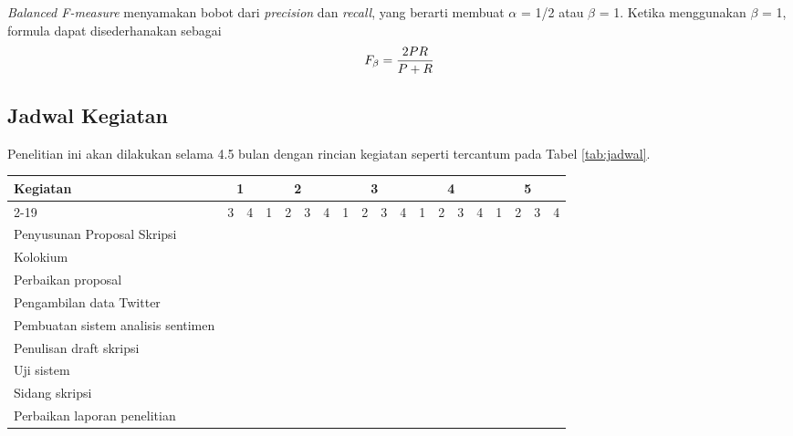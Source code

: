 \textit{Balanced F-measure} menyamakan bobot dari \textit{precision} dan \textit{recall}, yang berarti membuat $\alpha$ = 1/2 atau $\beta$ = 1. Ketika menggunakan $\beta$ = 1, formula dapat disederhanakan sebagai 
\begin{equation}
\begin{split}
\tiny
F_\beta = \frac{2PR}{P + R}
\label{eq:fmeasuredua}
\normalsize
\end{split}
\end{equation}

\subsection*{Jadwal Kegiatan}
Penelitian ini akan dilakukan selama 4.5 bulan dengan rincian kegiatan seperti tercantum pada Tabel \ref{tab:jadwal}.
\begin{table*}[t!]
	\begin{center}
		\caption{Rencana Jadwal Penelitian}
		\label{tab:jadwal}
		\footnotesize
		\begin{tabular}{|l|c|c|c|c|c|c|c|c|c|c|c|c|c|c|c|c|c|c|}
			\hline
			\multirow{2}{*}{Kegiatan}&\multicolumn{2}{c|}{1}&\multicolumn{4}{c|}{2}&\multicolumn{4}{c|}{3}&\multicolumn{4}{c|}{4}&\multicolumn{4}{c|}{5}\\
			\cline{2-19}
			&3&4&1&2&3&4&1&2&3&4&1&2&3&4&1&2&3&4\\
			\hline
			Penyusunan Proposal Skripsi&\cellcolor{black}&\cellcolor{black}&\cellcolor{black}&\cellcolor{black}&&&&&&&&&&&&&&\\
			\hline
			Kolokium&&&&&\cellcolor{black}&&&&&&&&&&&&&\\
			\hline
			Perbaikan proposal&&&&&&\cellcolor{black}&&&&&&&&&&&&\\
			\hline
			Pengambilan data Twitter&&&&&&\cellcolor{black}&\cellcolor{black}&\cellcolor{black}&&&&&&&&&&\\
			\hline
			Pembuatan sistem analisis sentimen &&&&&&&&\cellcolor{black}&\cellcolor{black}&\cellcolor{black}&\cellcolor{black}&&&&&&&\\
			\hline
			Penulisan draft skripsi&&&&&&&&&&&&\cellcolor{black}&\cellcolor{black}&\cellcolor{black}&\cellcolor{black}&&&\\
			\hline
			Uji sistem&&&&&&&&&&&&&&&&\cellcolor{black}&&\\
			\hline
			Sidang skripsi&&&&&&&&&&&&&&&&&\cellcolor{black}&\\
			\hline
			Perbaikan laporan penelitian&&&&&&&&&&&&&&&&&&\cellcolor{black}\\
			\hline
		\end{tabular}
		\normalsize
	\end{center}
\end{table*}